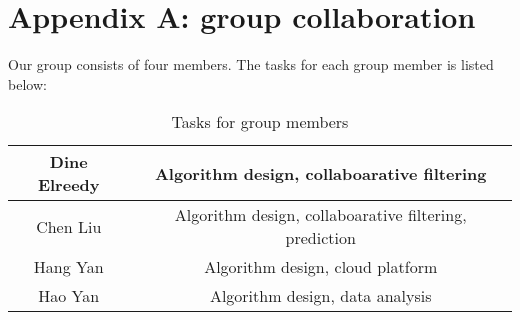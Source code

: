 \section*{Appendix A: group collaboration}
Our group consists of four members. The tasks for each group member is listed below:
\begin{table}[!ht]
  \centering
  \begin{tabular}{|c|c|}
    \hline
    Dine Elreedy & Algorithm design, collaboarative filtering\\
    \hline
    Chen Liu & Algorithm design, collaboarative filtering, prediction\\
    \hline
    Hang Yan & Algorithm design, cloud platform\\
    \hline
    Hao Yan & Algorithm design, data analysis\\
    \hline
  \end{tabular}
  \caption{Tasks for group members}
  \label{tab:group}
\end{table}
